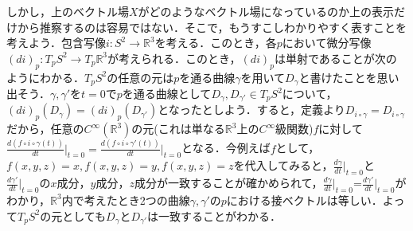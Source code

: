 \documentclass{jsarticle}
\def\realnum{{\mathbb R}}
\def\dfrac{\displaystyle\frac}
\begin{document}
しかし，上のベクトル場$X$がどのようなベクトル場になっているのか上の表示だけから推察するのは容易ではない．そこで，もうすこしわかりやすく表すことを考えよう．包含写像$i:S^2\rightarrow\realnum^3$を考える．このとき，各$p$において微分写像$(di)_p:T_pS^2\rightarrow T_p\realnum^3$が考えられる．このとき，$(di)_p$は単射であることが次のようにわかる．$T_pS^2$の任意の元は$p$を通る曲線$\gamma$を用いて$D_\gamma$と書けたことを思い出そう．$\gamma,\gamma'$を$t=0$で$p$を通る曲線として$D_\gamma,D_{\gamma'}\in T_pS^2$について，$(di)_p(D_\gamma)=(di)_p(D_{\gamma'})$となったとしよう．すると，定義より$D_{i\circ\gamma}=D_{i\circ\gamma}$だから，任意の$C^\infty(\realnum^3)$の元(これは単なる$\realnum^3$上の$C^\infty$級関数)$f$に対して$\dfrac{d(f\circ i\circ\gamma(t))}{dt}\Big|_{t=0}=\dfrac{d(f\circ i\circ\gamma'(t))}{dt}\Big|_{t=0}$となる．今例えば$f$として，$f(x,y,z)=x,f(x,y,z)=y,f(x,y,z)=z$を代入してみると，$\dfrac{d\gamma}{dt}\Big|_{t=0}$と$\dfrac{d\gamma'}{dt}\Big|_{t=0}$の$x$成分，$y$成分，$z$成分が一致することが確かめられて，$\dfrac{d\gamma}{dt}\Big|_{t=0}$=$\dfrac{d\gamma'}{dt}\Big|_{t=0}$がわかり，$\realnum^3$内で考えたとき2つの曲線$\gamma,\gamma'$の$p$における接ベクトルは等しい．よって$T_pS^2$の元としても$D_\gamma$と$D_{\gamma'}$は一致することがわかる．
\end{document}
